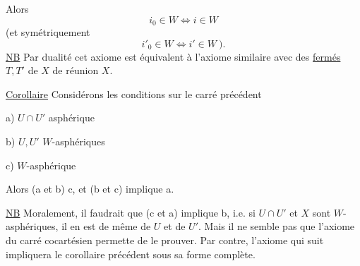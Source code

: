Alors
\[
i_0\in W\Longleftrightarrow i\in W
\]
(et symétriquement
\[
i'_0\in W\Longleftrightarrow i'\in W\ \bigr).
\]
\uline{NB} Par dualité cet axiome est équivalent à l'axiome similaire
avec des \uline{fermés} $T,T'$ de $X$ de réunion $X$.

\uline{Corollaire}\quad {} Considérons les conditions   sur
le carré précédent

a) $U\cap U'$ asphérique

b) $U,U'$ $W$-asphériques

c)  $W$-asphérique

Alors (a et b)  c, et (b et c) implique a.

\unsure{\{} \uline{NB} Moralement, il faudrait  que (c \deleted{$+$} et a) implique
 b, i.e. si $U\cap U'$ et $X$ sont $W$-asphériques,
il en est de même de $U$ et de $U'$. Mais
il ne semble pas que l'axiome du carré cocartésien
permette de le prouver. Par contre, l'axiome
qui suit impliquera le corollaire précédent sous sa
forme complète.


